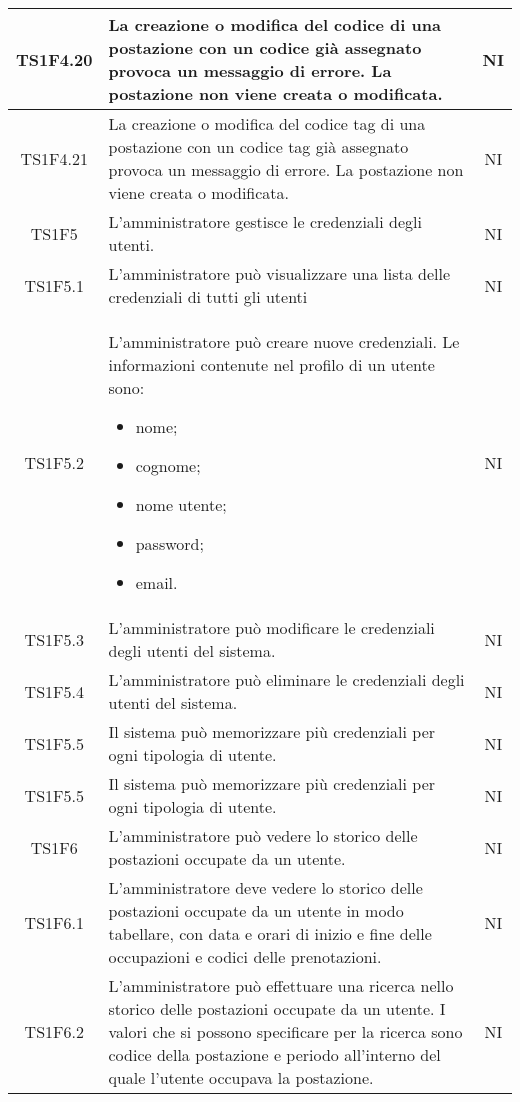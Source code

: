\begin{center}
\begin{longtable}{|c|p{10cm}|c|}
			\hline	
			TS1F4.20 & La creazione o modifica del codice di una postazione con un codice già assegnato provoca un messaggio di errore. La postazione non viene creata o modificata. & NI \\	
			\hline	
			TS1F4.21 & La creazione o modifica del codice tag di una postazione con un codice tag già assegnato provoca un messaggio di errore. La postazione non viene creata o modificata. & NI \\	
			\hline	
			TS1F5 & L'amministratore gestisce le credenziali degli utenti. & NI \\	
			\hline
			TS1F5.1 & L'amministratore può visualizzare una lista delle credenziali di tutti gli utenti & NI \\	
			\hline
			TS1F5.2 & L'amministratore può creare nuove credenziali. Le informazioni contenute nel profilo di un utente sono:
			\begin{itemize}
				\item nome;
				\item cognome;
				\item nome utente;
				\item password;
				\item email.
			\end{itemize} & NI \\	
			\hline
			TS1F5.3 & L’amministratore può modificare le credenziali degli utenti del sistema. & NI \\	
			\hline
			TS1F5.4 & L’amministratore può eliminare le credenziali degli utenti del sistema. & NI \\	
			\hline
			TS1F5.5 & Il sistema può memorizzare più credenziali per ogni tipologia di utente. & NI \\	
			\hline
			TS1F5.5 & Il sistema può memorizzare più credenziali per ogni tipologia di utente. & NI \\	
			\hline
			TS1F6 & L'amministratore può vedere lo storico delle postazioni occupate da un utente. & NI \\	
			\hline
			TS1F6.1 & L'amministratore deve vedere lo storico delle postazioni occupate da un utente in modo tabellare, con data e orari di inizio e fine delle occupazioni e codici delle prenotazioni. & NI \\	
			\hline
			TS1F6.2 & L'amministratore può effettuare una ricerca nello storico delle postazioni occupate da un utente. I valori che si possono specificare per la ricerca sono codice della postazione e periodo all'interno del quale l'utente occupava la postazione. & NI \\	

\end{longtable}
\end{center}
